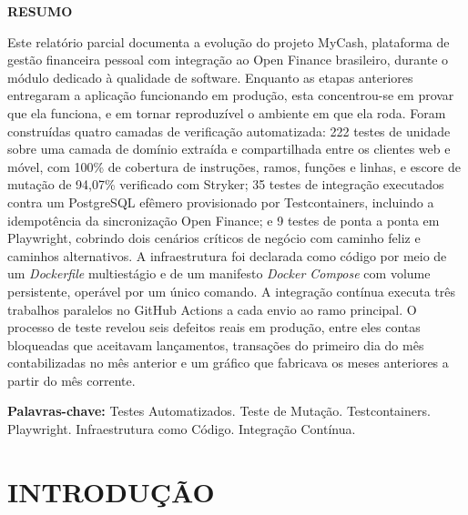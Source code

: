 \documentclass[12pt,a4paper]{article}
\begin{document}
\newpage
\begin{center}
    \textbf{RESUMO}
\end{center}
\vspace{1cm}
Este relatório parcial documenta a evolução do projeto MyCash, plataforma de gestão financeira pessoal com integração ao Open Finance brasileiro, durante o módulo dedicado à qualidade de software. Enquanto as etapas anteriores entregaram a aplicação funcionando em produção, esta concentrou-se em provar que ela funciona, e em tornar reproduzível o ambiente em que ela roda. Foram construídas quatro camadas de verificação automatizada: 222 testes de unidade sobre uma camada de domínio extraída e compartilhada entre os clientes web e móvel, com 100\% de cobertura de instruções, ramos, funções e linhas, e escore de mutação de 94,07\% verificado com Stryker; 35 testes de integração executados contra um PostgreSQL efêmero provisionado por Testcontainers, incluindo a idempotência da sincronização Open Finance; e 9 testes de ponta a ponta em Playwright, cobrindo dois cenários críticos de negócio com caminho feliz e caminhos alternativos. A infraestrutura foi declarada como código por meio de um \textit{Dockerfile} multiestágio e de um manifesto \textit{Docker Compose} com volume persistente, operável por um único comando. A integração contínua executa três trabalhos paralelos no GitHub Actions a cada envio ao ramo principal. O processo de teste revelou seis defeitos reais em produção, entre eles contas bloqueadas que aceitavam lançamentos, transações do primeiro dia do mês contabilizadas no mês anterior e um gráfico que fabricava os meses anteriores a partir do mês corrente.

\vspace{1cm}
\noindent \textbf{Palavras-chave:} Testes Automatizados. Teste de Mutação. Testcontainers. Playwright. Infraestrutura como Código. Integração Contínua.

\newpage
\tableofcontents
\thispagestyle{empty}
\newpage

\setcounter{page}{4}

\section{INTRODUÇÃO}
\end{document}
